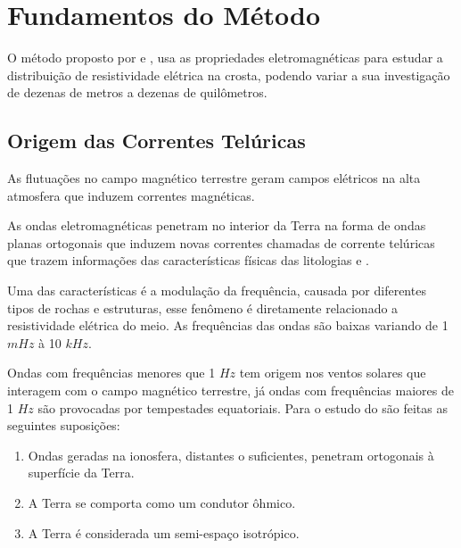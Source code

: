 \chapter{Fundamentos do Método \MT}
    \label{cap-fundamentosMT}    
    
    O método \MT proposto por \citeauthor{tikhonov50} \citeyearpar{tikhonov50} e
    \citeauthor{cagniard53} \citeyearpar{cagniard53}, usa as propriedades
    eletromagnéticas para estudar a distribuição de resistividade elétrica na crosta, 
    podendo variar a sua investigação de dezenas de metros a dezenas de 
    quilômetros.
    
    \section{Origem das Correntes Telúricas}
    
    As flutuações no campo magnético terrestre geram campos elétricos na alta atmosfera que induzem correntes magnéticas.
    
    As ondas eletromagnéticas penetram no interior da Terra na forma de ondas planas ortogonais que induzem novas correntes chamadas de corrente telúricas que trazem informações das características físicas das litologias \cite{tikhonov50} e \cite{cagniard53}.
    
    Uma das características é a modulação da frequência, causada por diferentes tipos de rochas e estruturas, esse fenômeno é diretamente 
	relacionado a resistividade elétrica do meio. As frequências das ondas são baixas variando de 1 $mHz$ à 10 $kHz$.
	
	Ondas com frequências menores que 1 $Hz$ tem origem nos ventos solares que interagem com o campo magnético terrestre, já ondas com frequências maiores de 1 $Hz$ são provocadas por tempestades equatoriais. Para o estudo do \MT são feitas as seguintes suposições:
    
    \begin{enumerate}
	    \item Ondas geradas na ionosfera, distantes o suficientes, penetram ortogonais à superfície da Terra.	    
	    \item A Terra se comporta como um condutor ôhmico.
	    \item A Terra é considerada um semi-espaço isotrópico.
	\end{enumerate}   
    
    
